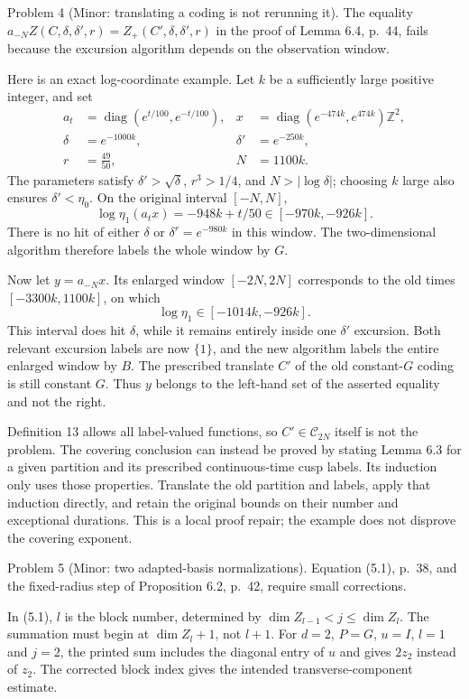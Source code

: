 \documentclass[10pt]{article}
\begin{document}
Problem 4 (Minor: translating a coding is not rerunning it).  The equality \(a_{-N}Z(C,\delta,\delta',r)=Z_+(C',\delta,\delta',r)\) in the proof of Lemma 6.4, p. 44, fails because the excursion algorithm depends on the observation window.\par
Here is an exact log-coordinate example. Let \(k\) be a sufficiently large positive integer, and set \[\begin{aligned}
 a_t&=\operatorname{diag}(e^{t/100},e^{-t/100}),&
 x&=\operatorname{diag}(e^{-474k},e^{474k})\mathbb Z^2,\\
 \delta&=e^{-1000k},&
 \delta'&=e^{-250k},\\
 r&=\frac{49}{50},&
 N&=1100k .\end{aligned}\] The parameters satisfy \(\delta'>\sqrt\delta\), \(r^3>1/4\), and \(N>|\log\delta|\); choosing \(k\) large also ensures \(\delta'<\eta_0\). On the original interval \([-N,N]\), \[\log\eta_1(a_t x)=-948k+t/50
                      \in[-970k,-926k].\] There is no hit of either \(\delta\) or \(\delta^r=e^{-980k}\) in this window. The two-dimensional algorithm therefore labels the whole window by \(G\).\par
Now let \(y=a_{-N}x\). Its enlarged window \([-2N,2N]\) corresponds to the old times \([-3300k,1100k]\), on which \[\log\eta_1\in[-1014k,-926k].\] This interval does hit \(\delta\), while it remains entirely inside one \(\delta'\) excursion. Both relevant excursion labels are now \(\{1\}\), and the new algorithm labels the entire enlarged window by \(B\). The prescribed translate \(C'\) of the old constant-\(G\) coding is still constant \(G\). Thus \(y\) belongs to the left-hand set of the asserted equality and not the right.\par
Definition 13 allows all label-valued functions, so \(C'\in\mathcal C_{2N}\) itself is not the problem. The covering conclusion can instead be proved by stating Lemma 6.3 for a given partition and its prescribed continuous-time cusp labels. Its induction only uses those properties. Translate the old partition and labels, apply that induction directly, and retain the original bounds on their number and exceptional durations. This is a local proof repair; the example does not disprove the covering exponent.\par
Problem 5 (Minor: two adapted-basis normalizations).  Equation (5.1), p. 38, and the fixed-radius step of Proposition 6.2, p. 42, require small corrections.\par
In (5.1), \(l\) is the block number, determined by \(\dim Z_{l-1}<j\le\dim Z_l\). The summation must begin at \(\dim Z_l+1\), not \(l+1\). For \(d=2\), \(P=G\), \(u=I\), \(l=1\) and \(j=2\), the printed sum includes the diagonal entry of \(u\) and gives \(2z_2\) instead of \(z_2\). The corrected block index gives the intended transverse-component estimate.\par
\end{document}
